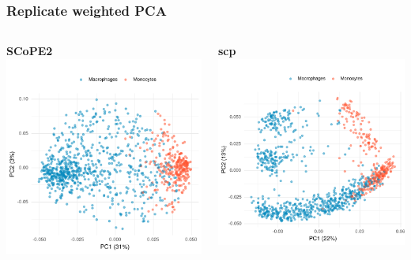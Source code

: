 \documentclass{beamer}
\newcommand{\frametitlesection}[1]{\frametitle{\centering #1 \footnotesize \hspace{0pt plus 1 filll} \insertsection}}
\begin{document}
\begin{frame}
    \frametitlesection{Replicate weighted PCA}
    
    \begin{columns}
        \begin{column}{0.5\textwidth}
            \textbf{SCoPE2}
            \includegraphics[width=\textwidth]{figs/wPCA_SCoPE2.pdf}
        \end{column}
        \begin{column}{0.5\textwidth}
            \textbf{scp}
            \includegraphics[width=\textwidth]{figs/wPCA_scp.pdf}
        \end{column}
    \end{columns}
    
\end{frame}
\end{document}
